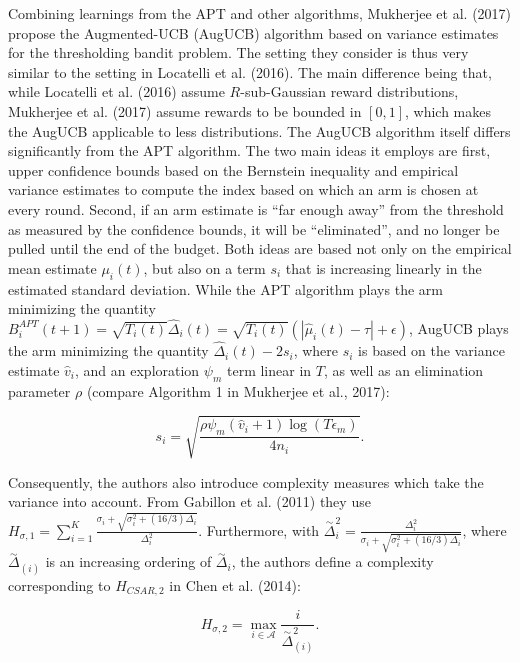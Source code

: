 \documentclass[12pt,]{article}
\begin{document}
Combining learnings from the APT and other algorithms, Mukherjee et al.
(2017) propose the Augmented-UCB (AugUCB) algorithm based on variance
estimates for the thresholding bandit problem. The setting they consider
is thus very similar to the setting in Locatelli et al. (2016). The main
difference being that, while Locatelli et al. (2016) assume
\(R\)-sub-Gaussian reward distributions, Mukherjee et al. (2017) assume
rewards to be bounded in \([0,1]\), which makes the AugUCB applicable to
less distributions. The AugUCB algorithm itself differs significantly
from the APT algorithm. The two main ideas it employs are first, upper
confidence bounds based on the Bernstein inequality and empirical
variance estimates to compute the index based on which an arm is chosen
at every round. Second, if an arm estimate is ``far enough away'' from
the threshold as measured by the confidence bounds, it will be
``eliminated'', and no longer be pulled until the end of the budget.
Both ideas are based not only on the empirical mean estimate
\(\mu_i(t)\), but also on a term \(s_i\) that is increasing linearly in
the estimated standard deviation. While the APT algorithm plays the arm
minimizing the quantity
\(B_i^{APT}(t+1) = \sqrt{T_i(t)} \hat{\Delta}_i(t) = \sqrt{T_i(t)} (|\hat{\mu}_i(t) - \tau| + \epsilon)\),
AugUCB plays the arm minimizing the quantity
\(\hat{\Delta}_i(t) - 2s_i\), where \(s_i\) is based on the variance
estimate \(\hat{v}_i\), and an exploration \(\psi_m\) term linear in
\(T\), as well as an elimination parameter \(\rho\) (compare Algorithm 1
in Mukherjee et al., 2017):

\begin{equation*}
s_i = \sqrt{\frac{\rho \psi_m (\hat{v}_i + 1) \log(T \epsilon_m)}{4n_i}}.
\end{equation*}

Consequently, the authors also introduce complexity measures which take
the variance into account. From Gabillon et al. (2011) they use
\(H_{\sigma, 1}= \sum_{i=1}^K \frac{\sigma_i + \sqrt{\sigma_i^2 + (16/3)\Delta_i}}{\Delta_i^2}\).
Furthermore, with
\(\stackrel{\sim}{\Delta}_i^2 = \frac{\Delta_i^2}{\sigma_i + \sqrt{\sigma_i^2 + (16/3)\Delta_i}}\),
where \(\stackrel{\sim}{\Delta}_{(i)}\) is an increasing ordering of
\(\stackrel{\sim}{\Delta}_i\), the authors define a complexity
corresponding to \(H_{CSAR,2}\) in Chen et al. (2014):

\begin{equation*}
H_{\sigma,2} = \max_{i \in \mathcal{A}} \frac{i}{\stackrel{\sim}{\Delta}_{(i)}^2}.
\end{equation*}
\end{document}

